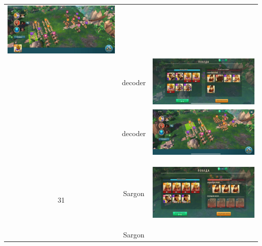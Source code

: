 \begin{longtable}{|c|c|c|}
	\includegraphics[width=0.75\linewidth]{./parts/media/TreasureHunt/30/decoder/photo_2022-04-07_09-59-28.jpg} \\
	& decoder &
	\includegraphics[width=0.75\linewidth]{./parts/media/TreasureHunt/30/decoder/photo_2022-04-07_09-59-40.jpg} \\
	& decoder &
	\includegraphics[width=0.75\linewidth]{./parts/media/TreasureHunt/30/decoder/photo_2022-04-07_10-00-22.jpg} \\
	\hline
	\multirow{8}{*}{31} & Sargon &
	\hypertarget{fight31}{\includegraphics[width=0.75\linewidth]{./parts/media/TreasureHunt/31/sargon/photo_2022-04-07_10-05-18.jpg}} \\
	& Sargon &

\end{longtable}
